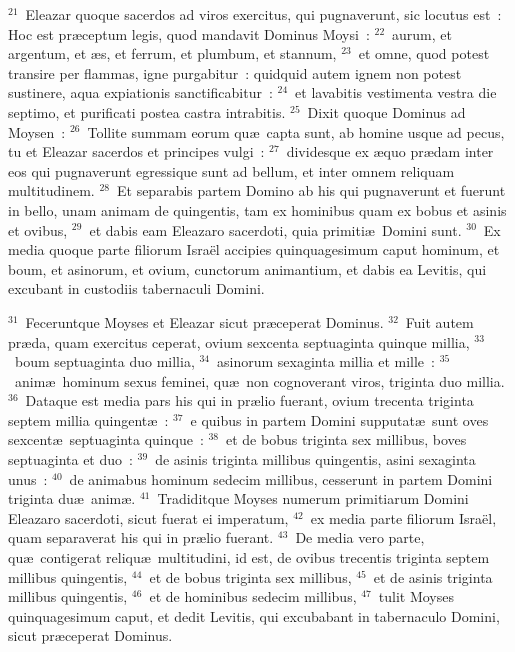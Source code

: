 ${}^{21}$~Eleazar quoque sacerdos ad viros exercitus, qui pugnaverunt, sic locutus est~: Hoc est pr\ae ceptum legis, quod mandavit Dominus Moysi~:
${}^{22}$~aurum, et argentum, et \ae s, et ferrum, et plumbum, et stannum,
${}^{23}$~et omne, quod potest transire per flammas, igne purgabitur~: quidquid autem ignem non potest sustinere, aqua expiationis sanctificabitur~:
${}^{24}$~et lavabitis vestimenta vestra die septimo, et purificati postea castra intrabitis.
${}^{25}$~Dixit quoque Dominus ad Moysen~:
${}^{26}$~Tollite summam eorum qu\ae\ capta sunt, ab homine usque ad pecus, tu et Eleazar sacerdos et principes vulgi~:
${}^{27}$~dividesque ex \ae quo pr\ae dam inter eos qui pugnaverunt egressique sunt ad bellum, et inter omnem reliquam multitudinem.
${}^{28}$~Et separabis partem Domino ab his qui pugnaverunt et fuerunt in bello, unam animam de quingentis, tam ex hominibus quam ex bobus et asinis et ovibus,
${}^{29}$~et dabis eam Eleazaro sacerdoti, quia primiti\ae\ Domini sunt.
${}^{30}$~Ex media quoque parte filiorum Isra\"el accipies quinquagesimum caput hominum, et boum, et asinorum, et ovium, cunctorum animantium, et dabis ea Levitis, qui excubant in custodiis tabernaculi Domini.


${}^{31}$~Feceruntque Moyses et Eleazar sicut pr\ae ceperat Dominus.
${}^{32}$~Fuit autem pr\ae da, quam exercitus ceperat, ovium sexcenta septuaginta quinque millia,
${}^{33}$~boum septuaginta duo millia,
${}^{34}$~asinorum sexaginta millia et mille~:
${}^{35}$~anim\ae\ hominum sexus feminei, qu\ae\ non cognoverant viros, triginta duo millia.
${}^{36}$~Dataque est media pars his qui in pr\ae lio fuerant, ovium trecenta triginta septem millia quingent\ae~:
${}^{37}$~e quibus in partem Domini supputat\ae\ sunt oves sexcent\ae\ septuaginta quinque~:
${}^{38}$~et de bobus triginta sex millibus, boves septuaginta et duo~:
${}^{39}$~de asinis triginta millibus quingentis, asini sexaginta unus~:
${}^{40}$~de animabus hominum sedecim millibus, cesserunt in partem Domini triginta du\ae\ anim\ae .
${}^{41}$~Tradiditque Moyses numerum primitiarum Domini Eleazaro sacerdoti, sicut fuerat ei imperatum,
${}^{42}$~ex media parte filiorum Isra\"el, quam separaverat his qui in pr\ae lio fuerant.
${}^{43}$~De media vero parte, qu\ae\ contigerat reliqu\ae\ multitudini, id est, de ovibus trecentis triginta septem millibus quingentis,
${}^{44}$~et de bobus triginta sex millibus,
${}^{45}$~et de asinis triginta millibus quingentis,
${}^{46}$~et de hominibus sedecim millibus,
${}^{47}$~tulit Moyses quinquagesimum caput, et dedit Levitis, qui excubabant in tabernaculo Domini, sicut pr\ae ceperat Dominus.


